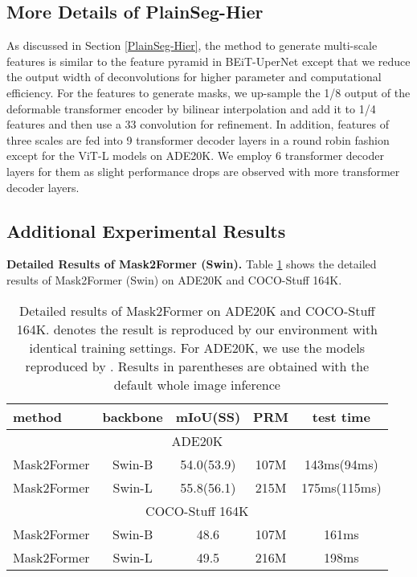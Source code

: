 \documentclass{article} \usepackage{iclr2024_conference,times}
\begin{document}
\subsection{More Details of PlainSeg-Hier}

As discussed in Section \ref{PlainSeg-Hier}, the method to generate multi-scale features is similar to the feature pyramid in BEiT-UperNet \citep{bao2022beit} except that we reduce the output width of deconvolutions for higher parameter and computational efficiency. For the features to generate masks, we up-sample the 1/8 output of the deformable transformer encoder by bilinear interpolation and add it to 1/4 features and then use a 33 convolution for refinement. In addition, features of three scales are fed into 9 transformer decoder layers in a round robin fashion except for the ViT-L models on ADE20K. We employ 6 transformer decoder layers for them as slight performance drops are observed with more transformer decoder layers.


\subsection{Additional Experimental Results}

\textbf{Detailed Results of Mask2Former (Swin).} Table \ref{tab:10} shows the detailed results of Mask2Former (Swin) on ADE20K and COCO-Stuff 164K.

\begin{table}[h]
\caption{Detailed results of Mask2Former \citep{cheng2022masked} on ADE20K and COCO-Stuff 164K.  denotes the result is reproduced by our environment with identical training settings. For ADE20K, we use the models reproduced by . Results in parentheses are obtained with the default whole image inference}
\begin{center}
\label{tab:10}
\begin{tabular}{l|cccc}
\toprule
method  & backbone   &mIoU(SS)  & PRM  &test time\\\midrule
\multicolumn{5}{c}{ADE20K} \\ \midrule
Mask2Former &Swin-B &54.0(53.9) & 107M & 143ms(94ms)\\
Mask2Former &Swin-L &55.8(56.1) & 215M & 175ms(115ms)\\\midrule
\multicolumn{5}{c}{COCO-Stuff 164K} \\ \midrule
Mask2Former &Swin-B &48.6 & 107M & 161ms\\
Mask2Former &Swin-L &49.5 & 216M & 198ms\\
\bottomrule
\end{tabular}
\end{center}
\end{table}
\end{document}
